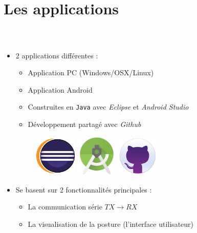 \documentclass{beamer}
\begin{document}
\section{Les applications}
\begin{frame}
\frametitle{\textcolor{white}{Les applications}}
\begin{itemize}
\item 2 applications différentes :
\begin{itemize}
\item Application PC (Windows/OSX/Linux)
\item Application Android
\item Construites en \texttt{Java} avec \textit{Eclipse} et \textit{Android Studio}
\item Développement partagé avec \textit{Github}
\end{itemize}

\begin{figure}
\includegraphics[height=2cm]{images/eclipse.png}
\hspace{1cm}
\includegraphics[height=2cm]{images/android-studio.png}
\hspace{1cm}
\includegraphics[height=2cm]{images/github.png}
\end{figure}

\item Se basent sur 2 fonctionnalités principales :
\begin{itemize}
\item La communication série $TX \rightarrow RX$
\item La visualisation de la posture (l'interface utilisateur)
\end{itemize}
\end{itemize}

\end{frame}
\end{document}
